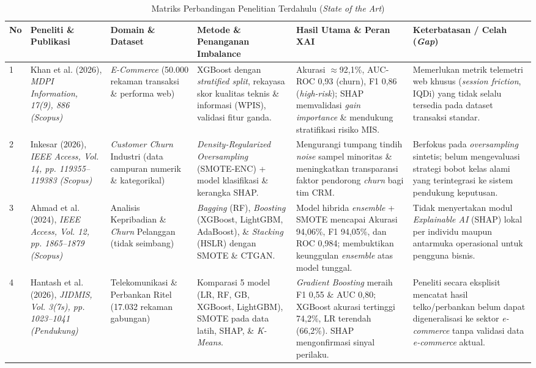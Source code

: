 \documentclass[11pt,a4paper]{article}
\newcommand{\thdr}[1]{\textbf{#1}}
\begin{document}
\begin{table}[H]
  \centering
  \caption{Matriks Perbandingan Penelitian Terdahulu (\textit{State of the Art})}
  \label{tab:sota}
  \renewcommand{\arraystretch}{1.25}
  \setlength{\tabcolsep}{3.5pt}
  \scriptsize
  \begin{tabularx}{\textwidth}{@{}M{0.5cm} P{2.2cm} P{1.9cm} L L L@{}}
    \toprule
    \thdr{No} & \thdr{Peneliti \& Publikasi} & \thdr{Domain \& Dataset} & \thdr{Metode \& Penanganan Imbalance} & \thdr{Hasil Utama \& Peran XAI} & \thdr{Keterbatasan / Celah (\textit{Gap})} \\
     & Khan et al. (2026), \textit{MDPI Information, 17(9), 886 (Scopus)} & \textit{E-Commerce} (50.000 rekaman transaksi \& performa web) & XGBoost dengan \textit{stratified split}, rekayasa skor kualitas teknis \& informasi (WPIS), validasi fitur ganda. & Akurasi $\approx$92,1\%, AUC-ROC 0,93 (churn), F1 0,86 (\textit{high-risk}); SHAP memvalidasi \textit{gain importance} \& mendukung stratifikasi risiko MIS. & Memerlukan metrik telemetri web khusus (\textit{session friction}, IQDi) yang tidak selalu tersedia pada dataset transaksi standar. \\
    2 & Inkesar (2026), \textit{IEEE Access, Vol. 14, pp. 119355--119383 (Scopus)} & \textit{Customer Churn} Industri (data campuran numerik \& kategorikal) & \textit{Density-Regularized Oversampling} (SMOTE-ENC) + model klasifikasi \& kerangka SHAP. & Mengurangi tumpang tindih \textit{noise} sampel minoritas \& meningkatkan transparansi faktor pendorong \textit{churn} bagi tim CRM. & Berfokus pada \textit{oversampling} sintetis; belum mengevaluasi strategi bobot kelas alami yang terintegrasi ke sistem pendukung keputusan. \\
    3 & Ahmad et al. (2024), \textit{IEEE Access, Vol. 12, pp. 1865--1879 (Scopus)} & Analisis Kepribadian \& \textit{Churn} Pelanggan (tidak seimbang) & \textit{Bagging} (RF), \textit{Boosting} (XGBoost, LightGBM, AdaBoost), \& \textit{Stacking} (HSLR) dengan SMOTE \& CTGAN. & Model hibrida \textit{ensemble} + SMOTE mencapai Akurasi 94,06\%, F1 94,05\%, dan ROC 0,984; membuktikan keunggulan \textit{ensemble} atas model tunggal. & Tidak menyertakan modul \textit{Explainable AI} (SHAP) lokal per individu maupun antarmuka operasional untuk pengguna bisnis. \\
    4 & Hantash et al. (2026), \textit{JIDMIS, Vol. 3(7s), pp. 1023--1041 (Pendukung)} & Telekomunikasi \& Perbankan Ritel (17.032 rekaman gabungan) & Komparasi 5 model (LR, RF, GB, XGBoost, LightGBM), SMOTE pada data latih, SHAP, \& \textit{K-Means}. & \textit{Gradient Boosting} meraih F1 0,55 \& AUC 0,80; XGBoost akurasi tertinggi 74,2\%, LR terendah (66,2\%). SHAP mengonfirmasi sinyal perilaku. & Peneliti secara eksplisit mencatat hasil telko/perbankan belum dapat digeneralisasi ke sektor \textit{e-commerce} tanpa validasi data \textit{e-commerce} aktual. \\
    \bottomrule
  \end{tabularx}
\end{table}
\end{document}
